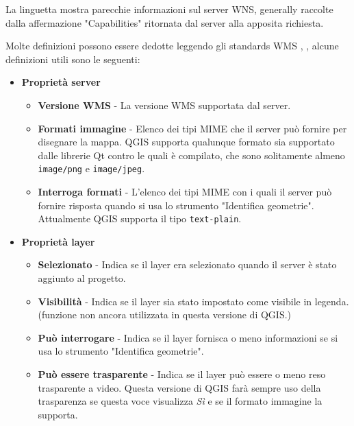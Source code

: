 La linguetta  mostra parecchie informazioni sul server WNS,
generally raccolte dalla affermazione "Capabilities" ritornata dal server alla
apposita richiesta.

Molte definizioni possono essere dedotte leggendo gli standards WMS \cite{OGCWMS010101web}, \cite{OGCWMS010300web}, alcune definizioni utili sono le seguenti:

\begin{itemize}
\item \textbf{Proprietà server}

\begin{itemize}
\item \textbf{Versione WMS}      - La versione WMS supportata dal server.

\item \textbf{Formati immagine}  - Elenco dei tipi MIME che il server può
                                   fornire  per disegnare la mappa. QGIS
				   supporta qualunque formato sia supportato
				   dalle librerie Qt contro le quali è
				   compilato, che sono solitamente almeno \texttt{image/png}
				   e \texttt{image/jpeg}.

\item \textbf{Interroga formati} - L'elenco dei tipi MIME con i quali il server
                                   può fornire risposta quando si usa lo strumento
				   "Identifica geometrie". Attualmente QGIS supporta
				   il tipo \texttt{text-plain}.

\end{itemize}

\item \textbf{Proprietà layer}

\begin{itemize}
\item \textbf{Selezionato}         - Indica se il layer era selezionato quando
                                     il server è stato aggiunto al progetto.

\item \textbf{Visibilità}          - Indica se il layer sia stato impostato
                                     come visibile in legenda.  (funzione non ancora utilizzata
				     in questa versione di QGIS.)

\item \textbf{Può interrogare}     - Indica se il layer fornisca o meno
                                     informazioni se si usa lo strumento "Identifica geometrie".

\item \textbf{Può essere trasparente} - Indica se il layer può essere o meno
                                        reso trasparente a video. Questa
					versione di QGIS farà sempre uso della
					trasparenza se questa voce visualizza
					\textsl{Sì} e se il formato immagine
					la supporta.


\end{itemize}
\end{itemize}
